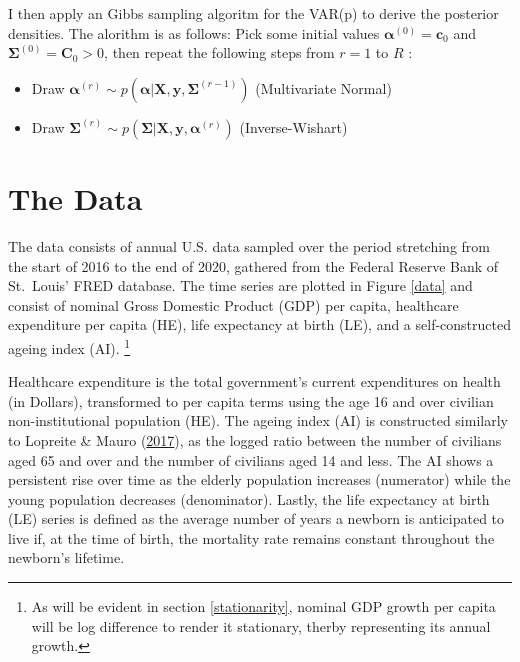 \documentclass[11pt,preprint, authoryear]{elsarticle}
\numberwithin{equation}{section}
\numberwithin{figure}{section}
\numberwithin{table}{section}
\let\rmarkdownfootnote\footnote%
\def\footnote{\protect\rmarkdownfootnote}
\begin{document}
I then apply an Gibbs sampling algoritm for the VAR(p) to derive the
posterior densities. The alorithm is as follows: Pick some initial
values \(\bm{\alpha}^{(0)} = \bm{c}_0\) and
\(\bm{\Sigma}^{(0)} = \bm{C}_0 > 0\), then repeat the following steps
from \(r =1\) to \(R\) :

\begin{itemize}
 \item   Draw $\bm{\alpha}^{(r)} \sim p(\bm{\alpha}| \bm{X}, \bm{y}, \bm{\Sigma}^{(r-1)})$  (Multivariate Normal) 
 \item   Draw $\bm{\Sigma}^{(r)} \sim p(\bm{\Sigma}| \bm{X}, \bm{y}, \bm{\alpha}^{(r)})$    (Inverse-Wishart)
\end{itemize}

\hypertarget{the-data}{%
\section{\texorpdfstring{The Data
\label{data}}{The Data }}\label{the-data}}

The data consists of annual U.S. data sampled over the period stretching
from the start of 2016 to the end of 2020, gathered from the Federal
Reserve Bank of St.~Louis' FRED database. The time series are plotted in
Figure \ref{data} and consist of nominal Gross Domestic Product (GDP)
per capita, healthcare expenditure per capita (HE), life expectancy at
birth (LE), and a self-constructed ageing index (AI). \footnote{As will
  be evident in section \ref{stationarity}, nominal GDP growth per
  capita will be log difference to render it stationary, therby
  representing its annual growth.}

Healthcare expenditure is the total government's current expenditures on
health (in Dollars), transformed to per capita terms using the age 16
and over civilian non-institutional population (HE). The ageing index
(AI) is constructed similarly to Lopreite \& Mauro
(\protect\hyperlink{ref-lopreite2017}{2017}), as the logged ratio
between the number of civilians aged 65 and over and the number of
civilians aged 14 and less. The AI shows a persistent rise over time as
the elderly population increases (numerator) while the young population
decreases (denominator). Lastly, the life expectancy at birth (LE)
series is defined as the average number of years a newborn is
anticipated to live if, at the time of birth, the mortality rate remains
constant throughout the newborn's lifetime.
\end{document}
